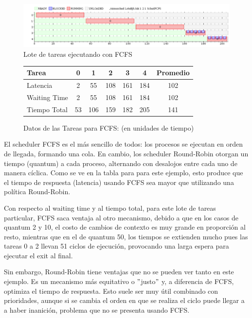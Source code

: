 
\begin{figure}[H]
\caption{Lote de tareas ejecutando con FCFS}
\label{fig:ej6}
\includegraphics[width=1\textwidth]{imgs/ej6.png}
\end{figure}



\begin{figure}[H]
\begin{center}
  \caption{Datos de las Tareas para FCFS: (en unidades de tiempo)}
\begin{tabular}{| l | c | c | c | c | c | c |}
\hline  
\textbf{Tarea} & \textbf{0} & \textbf{1} & \textbf{2} & \textbf{3} & \textbf{4}  & \textbf{Promedio} \\ \hline
Latencia & 2 & 55 & 108 & 161 & 184 & 102  \\ \hline
Waiting Time & 2 & 55 & 108 & 161 & 184 & 102  \\ \hline
Tiempo Total & 53 & 106 & 159 & 182 & 205 & 141  \\ \hline
\end{tabular}
\end{center}
\end{figure}

\par El scheduler FCFS es el más sencillo de todos: los procesos se ejecutan en orden de llegada, formando una cola. En cambio, los scheduler Round-Robin otorgan un tiempo (quantum) a cada proceso, alternando con desalojos entre cada uno de manera cíclica. Como se ve en la tabla para para este ejemplo, esto produce que el tiempo de respuesta (latencia) usando FCFS sea mayor que utilizando una política Round-Robin. 
\par Con respecto al waiting time y al tiempo total, para este lote de tareas particular, FCFS saca ventaja al otro mecanismo, debido a que en los casos de quantum 2 y 10, el costo de cambios de contexto es muy grande en proporción al resto, mientras que en el de quantum 50, los tiempos se extienden mucho pues las tareas 0 a 2 llevan 51 ciclos de ejecución, provocando una larga espera para ejecutar el exit al final. 
\par Sin embargo, Round-Robin tiene ventajas que no se pueden ver tanto en este ejemplo. Es un mecanismo más equitativo o $"$justo$"$ y, a diferencia de FCFS, optimiza el tiempo de respuesta. Esto suele ser muy útil combinado con prioridades, aunque si se cambia el orden en que se realiza el ciclo puede llegar a a haber inanición, problema que no se presenta usando FCFS.

